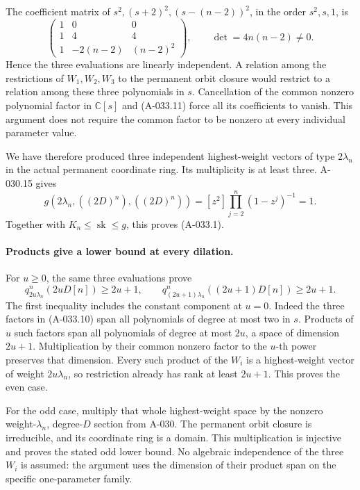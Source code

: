The coefficient matrix of
\(s^2,(s+2)^2,(s-(n-2))^2\), in the order \(s^2,s,1\), is
\[
 \begin{pmatrix}
 1&0&0\\
 1&4&4\\
 1&-2(n-2)&(n-2)^2
 \end{pmatrix},
 \qquad\det=4n(n-2)\ne0.                                      \tag{A-033.11}
\]
Hence the three evaluations are linearly independent.
A relation among the restrictions of \(W_1,W_2,W_3\)
to the permanent orbit closure would restrict to a relation
among these three polynomials in \(s\).
Cancellation of the common nonzero polynomial factor in
\(\mathbb C[s]\) and (A-033.11) force all its coefficients
to vanish. This argument does not require the common factor
to be nonzero at every individual parameter value.

We have therefore produced three independent highest-weight
vectors of type \(2\lambda_n\) in the actual permanent
coordinate ring. Its multiplicity is at least three.
A-030.15 gives
\[
 g(2\lambda_n,((2D)^n),((2D)^n))
             =[z^2]\prod_{j=2}^n(1-z^j)^{-1}=1.
 \]
Together with \(K_n\leq\operatorname{sk}\leq g\), this proves
(A-033.1).

\paragraph{Products give a lower bound at every dilation.}
For \(u\geq0\), the same three evaluations prove
\[
 q^n_{2u\lambda_n}(2uD[n])\geq2u+1,\qquad
 q^n_{(2u+1)\lambda_n}((2u+1)D[n])\geq2u+1.                    \tag{A-033.12}
\]
The first inequality includes the constant component at \(u=0\).
Indeed the three factors in (A-033.10) span all polynomials
of degree at most two in \(s\). Products of \(u\) such factors
span all polynomials of degree at most \(2u\), a space of
dimension \(2u+1\). Multiplication by their common nonzero
factor to the \(u\)-th power preserves that dimension.
Every such product of the \(W_i\) is a highest-weight vector
of weight \(2u\lambda_n\), so restriction already has rank at
least \(2u+1\). This proves the even case.

For the odd case, multiply that whole highest-weight space by
the nonzero weight-\(\lambda_n\), degree-\(D\) section from
A-030. The permanent orbit closure is irreducible, and its
coordinate ring is a domain. This multiplication is injective
and proves the stated odd lower bound.
No algebraic independence of the three \(W_i\) is assumed:
the argument uses the dimension of their product span on the
specific one-parameter family.

